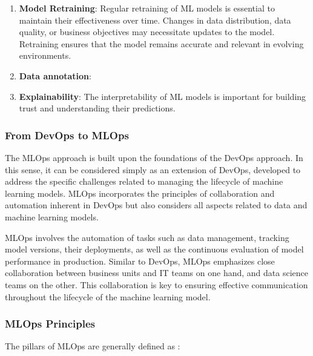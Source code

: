 \begin{enumerate}
    \item \textbf{Model Retraining}: Regular retraining of ML models is essential to maintain their effectiveness over time. Changes in data distribution, data quality, or business objectives may necessitate updates to the model. Retraining ensures that the model remains accurate and relevant in evolving environments.

    \item \textbf{Data annotation}: 

    \item \textbf{Explainability}: The interpretability of ML models is important for building trust and understanding their predictions.
\end{enumerate}


\subsubsection{From DevOps to MLOps}

The MLOps approach is built upon the foundations of the DevOps approach. In this sense, it can be considered simply as an extension of DevOps, developed to address the specific challenges related to managing the lifecycle of machine learning models. MLOps incorporates the principles of collaboration and automation inherent in DevOps but also considers all aspects related to data and machine learning models.


MLOps involves the automation of tasks such as data management, tracking model versions, their deployments, as well as the continuous evaluation of model performance in production. Similar to DevOps, MLOps emphasizes close collaboration between business units and IT teams on one hand, and data science teams on the other. This collaboration is key to ensuring effective communication throughout the lifecycle of the machine learning model.

\subsubsection{MLOps Principles}

The pillars of MLOps\cite{kreuzberger2023machine} are generally defined as :

